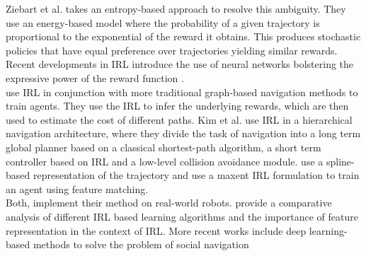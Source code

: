 Ziebart et al. \cite{ziebart_maxent_2008} takes an entropy-based approach to resolve this ambiguity. They use an energy-based model where the probability of a given trajectory is proportional to the exponential of the reward it obtains.
This produces stochastic policies that have equal preference over trajectories yielding similar rewards. Recent developments in IRL introduce the use of neural networks bolstering the expressive power of the reward function \cite{wulfmeier2015maximum}. \\

 \cite{shiarlis_rapidly_2017, okal_efcient_nodate} use IRL in conjunction with more traditional graph-based navigation methods to train agents. They use the IRL to infer the underlying rewards, which are then used to estimate the cost of different paths. Kim et al. \cite{kim_socially_2016} use IRL in a hierarchical navigation architecture, where they divide the task of navigation into a long term global planner based on a classical shortest-path algorithm, a short term controller based on IRL and a low-level collision avoidance module. \cite{kretzschmar_socially_2016} use a spline-based representation of the trajectory and use a maxent IRL formulation to train an agent using feature matching. 
\\
Both,\cite{kim_socially_2016, kretzschmar_socially_2016} implement their method on real-world robots. \cite{vasquez_inverse_2014} provide a comparative analysis of different IRL based learning algorithms and the importance of feature representation in the context of IRL. More recent works include deep learning-based methods to solve the problem of social navigation \cite{fahad_learning_2018, wulfmeier2015maximum}



